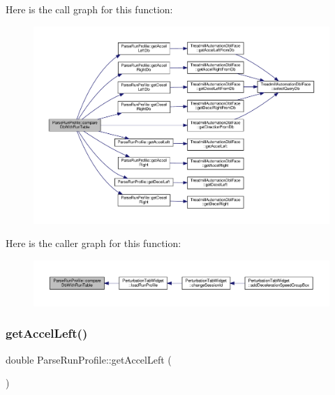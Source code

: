 Here is the call graph for this function\+:
\nopagebreak
\begin{figure}[H]
\begin{center}
\leavevmode
\includegraphics[width=350pt]{class_parse_run_profile_a474ddfd418805f06313732935611ac37_cgraph}
\end{center}
\end{figure}
Here is the caller graph for this function\+:
\nopagebreak
\begin{figure}[H]
\begin{center}
\leavevmode
\includegraphics[width=350pt]{class_parse_run_profile_a474ddfd418805f06313732935611ac37_icgraph}
\end{center}
\end{figure}
\mbox{\label{class_parse_run_profile_a07cda302c0032d378d1b10d0045e25be}} 
\subsubsection{\texorpdfstring{get\+Accel\+Left()}{getAccelLeft()}}
{\footnotesize\ttfamily double Parse\+Run\+Profile\+::get\+Accel\+Left (\begin{DoxyParamCaption}{ }\end{DoxyParamCaption})}



